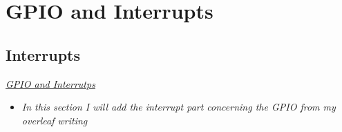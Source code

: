 

\chapter{GPIO and Interrupts}

\section{Interrupts}

 \underline{\textit{GPIO and Interrutps}} 

\begin{itemize}

\item \textit{In this section I will add the interrupt part concerning the GPIO from my overleaf writing}

\end{itemize}


